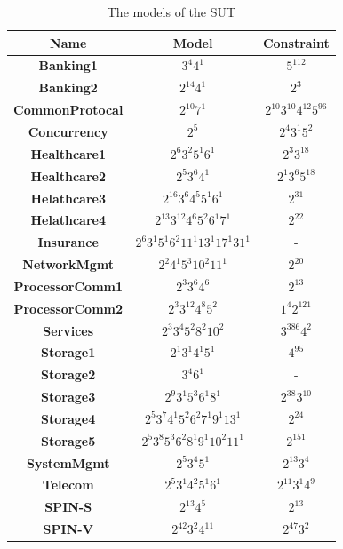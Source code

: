 \documentclass[conference]{IEEEtran}
\theoremstyle{definition}
\begin{document}
\begin{table}[!ht]
\caption{The models of the SUT}
\label{model_of_sut_of_subjects}
\center
    \begin{tabular}{|c|c|c|} \hline
    \textbf{Name} & \textbf{Model} & \textbf{Constraint}  \\
    \hline
    \textbf{Banking1} & $3^{4}4^{1}$ & $5^{112}$ \\
    \textbf{Banking2} & $2^{14}4^{1}$ & $2^{3}$ \\
    \textbf{CommonProtocal} & $2^{10}7^{1}$ & $2^{10}3^{10}4^{12}5^{96}$\\
    \textbf{Concurrency} & $2^{5}$ & $2^{4}3^{1}5^{2}$ \\
    \textbf{Healthcare1} & $2^{6}3^{2}5^{1}6^{1}$ & $2^{3}3^{18}$ \\
    \textbf{Healthcare2} & $2^{5}3^{6}4^{1}$ & $2^{1}3^{6}5^{18}$\\
    \textbf{Helathcare3} & $2^{16}3^{6}4^{5}5^{1}6^{1}$ & $2^{31}$ \\
    \textbf{Helathcare4} & $2^{13}3^{12}4^{6}5^{2}6^{1}7^{1}$ & $2^{22}$\\
    \textbf{Insurance} & $2^{6}3^{1}5^{1}6^{2}11^{1}13^{1}17^{1}31^{1}$ & - \\
    \textbf{NetworkMgmt} & $2^{2}4^{1}5^{3}10^{2}11^{1}$ & $2^{20}$\\
    \textbf{ProcessorComm1} & $2^{3}3^{6}4^{6}$ & $2^{13}$ \\
    \textbf{ProcessorComm2} & $2^{3}3^{12}4^{8}5^{2}$ & $1^{4}2^{121}$ \\
    \textbf{Services} & $2^{3}3^{4}5^{2}8^{2}10^{2}$ & $3^{386}4^{2}$ \\
    \textbf{Storage1} & $2^{1}3^{1}4^{1}5^{1}$ & $4^{95}$ \\
    \textbf{Storage2} & $3^{4}6^{1}$ & - \\
    \textbf{Storage3} & $2^{9}3^{1}5^{3}6^{1}8^{1}$ & $2^{38}3^{10}$ \\
    \textbf{Storage4} & $2^{5}3^{7}4^{1}5^{2}6^{2}7^{1}9^{1}13^{1}$ & $2^{24}$ \\
    \textbf{Storage5} & $2^{5}3^{8}5^{3}6^{2}8^{1}9^{1}10^{2}11^{1}$ & $2^{151}$ \\
    \textbf{SystemMgmt} & $2^{5}3^{4}5^{1}$ & $2^{13}3^{4}$ \\
    \textbf{Telecom} & $2^{5}3^{1}4^{2}5^{1}6^{1}$ & $2^{11}3^{1}4^{9}$ \\
    \textbf{SPIN-S} & $2^{13}4^{5}$ & $2^{13}$ \\
    \textbf{SPIN-V} & $2^{42}3^{2}4^{11}$ & $2^{47}3^{2}$ \\

\end{tabular}
\end{table}
\end{document}
